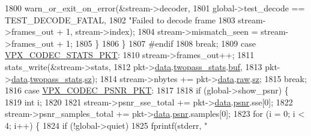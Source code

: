 \begin{DoxyCodeInclude}
{{{{{{{{{{{{{{{{{{{{{{{{{{{{{{{{{{{{{{{{{{{{{{{{{1800             warn\_or\_exit\_on\_error(&stream->decoder,
1801                                   global->test\_decode == TEST\_DECODE\_FATAL,
1802                                   \textcolor{stringliteral}{"Failed to decode frame %
1803                                   stream->frames\_out + 1, stream->index);
1804             stream->mismatch\_seen = stream->frames\_out + 1;
1805           \}
1806         \}
1807 \textcolor{preprocessor}{#endif}
1808         \textcolor{keywordflow}{break};
1809       \textcolor{keywordflow}{case} \hyperlink{group__encoder_gga28a79375279536526552af3a83d2ed72a77cd8b95d9891bcce36117f5f31994fd}{VPX\_CODEC\_STATS\_PKT}:
1810         stream->frames\_out++;
1811         stats\_write(&stream->stats,
1812                     pkt->\hyperlink{structvpx__codec__cx__pkt_a7f97b060a23b7e89fe5b885c0074f696}{data}.\hyperlink{structvpx__codec__cx__pkt_a53db8576979fa7335e478eb849b256f1}{twopass\_stats}.\hyperlink{structvpx__fixed__buf_ac93e43ae3fcc1023dca86d37016ae3f0}{buf},
1813                     pkt->\hyperlink{structvpx__codec__cx__pkt_a7f97b060a23b7e89fe5b885c0074f696}{data}.\hyperlink{structvpx__codec__cx__pkt_a53db8576979fa7335e478eb849b256f1}{twopass\_stats}.\hyperlink{structvpx__fixed__buf_a43d7f8247ed9752f65f0a7639817ae84}{sz});
1814         stream->nbytes += pkt->\hyperlink{structvpx__codec__cx__pkt_a7f97b060a23b7e89fe5b885c0074f696}{data}.\hyperlink{structvpx__codec__cx__pkt_acc7ee91ea9c907aea7c3b953324f7c26}{raw}.\hyperlink{structvpx__fixed__buf_a43d7f8247ed9752f65f0a7639817ae84}{sz};
1815         \textcolor{keywordflow}{break};
1816       \textcolor{keywordflow}{case} \hyperlink{group__encoder_gga28a79375279536526552af3a83d2ed72a11eefa1328e6d22eb7c844645a260628}{VPX\_CODEC\_PSNR\_PKT}:
1817 
1818         \textcolor{keywordflow}{if} (global->show\_psnr) \{
1819           \textcolor{keywordtype}{int} i;
1820 
1821           stream->psnr\_sse\_total += pkt->\hyperlink{structvpx__codec__cx__pkt_a7f97b060a23b7e89fe5b885c0074f696}{data}.\hyperlink{structvpx__codec__cx__pkt_a63744aeceb50355d6402d55309c151b6}{psnr}.sse[0];
1822           stream->psnr\_samples\_total += pkt->\hyperlink{structvpx__codec__cx__pkt_a7f97b060a23b7e89fe5b885c0074f696}{data}.\hyperlink{structvpx__codec__cx__pkt_a63744aeceb50355d6402d55309c151b6}{psnr}.samples[0];
1823           \textcolor{keywordflow}{for} (i = 0; i < 4; i++) \{
1824             \textcolor{keywordflow}{if} (!global->quiet)
1825               fprintf(stderr, \textcolor{stringliteral}{"%
}}}}}}}}}}}}}}}}}}}}}}}}}}}}}}}}}}}}}}}}}}}}}}}}}}}
\end{DoxyCodeInclude}
